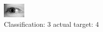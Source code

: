 \begin{figure}[h!]
\begin{center}
\includegraphics[width=0.60\columnwidth]{figures/ID3177_class_3_target_4.png}
\end{center}
\caption{ Classification: 3 actual target: 4}
\label{fig:ID3177_class_3_target_4}
\end{figure}

